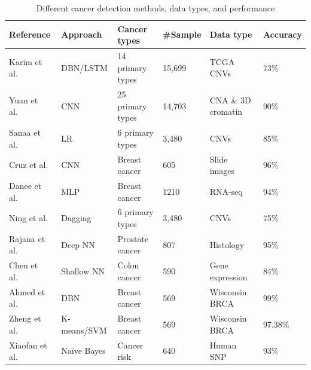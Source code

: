 \begin{table}[!ht]
    \caption{Different cancer detection methods, data types, and performance }
    \label{table:stateofart}
    \begin{center}
    \scriptsize
    \vspace{-6mm}
    \begin{tabular}{l|l|l|l|l|l}
        \hline
        \textbf{Reference} & \textbf{Approach} & \textbf{Cancer types} & \textbf{\#Sample} & \textbf{Data type} & \textbf{Accuracy} \\\hline
            Karim et al.~\cite{karim2018a2ic} & DBN/LSTM & 14 primary types & 15,699 & TCGA CNVs & 73\% \\\hline %
            Yuan et al.~\cite{yuan2018cancer} & CNN & 25 primary types & 14,703 & CNA \& 3D cromatin & 90\% \\\hline %
            Sanaa et al.~\cite{elsadek2018supervised} & LR & 6 primary types & 3,480  & CNVs & 85\% \\\hline %
        	Cruz et al.~\cite{19Cruz} & CNN & Breast cancer  & 605 & Slide images & 96\%  \\\hline  %
            Danee et al.~\cite{17Danaee} & MLP & Breast cancer & 1210 & RNA-seq & 94\% \\\hline %
            Ning et al.~\cite{zhang2016classification} & Dagging & 6 primary types & 3,480  & CNVs & 75\% \\\hline %
        	Rajana et al.~\cite{20Rajanna} & Deep NN & Prostate cancer & 807 & Histology & 95\%\\\hline
            Chen et al.~\cite{18Chen} & Shallow NN & Colon cancer  & 590 & Gene expression & 84\% \\ \hline %
            Ahmed et al.~\cite{abdel2016breast} & DBN & Breast cancer & 569 & Wisconsin BRCA & 99\% \\ \hline %
            Zheng et al.~\cite{23Zheng} & K-means/SVM & Breast cancer & 569 & Wisconsin BRCA & 97.38\% \\ \hline %
            Xiaofan et al.~\cite{ding2014application} & Naïve Bayes & Cancer risk & 640 & Human SNP & 93\% \\ \hline %
        \end{tabular}
        \vspace{-6mm}
    \end{center}
\end{table}

